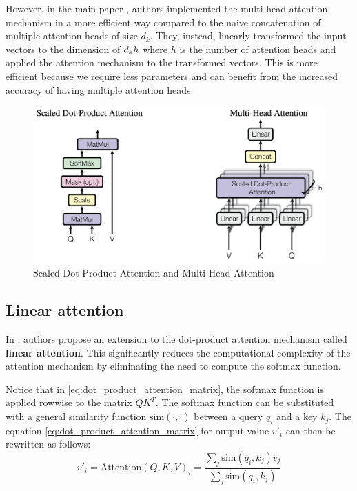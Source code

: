 \documentclass[a4paper, twoside]{report}
\theoremstyle{definition}
\numberwithin{equation}{section}
\begin{document}
However, in the main paper \cite{1706.03762}, authors implemented the multi-head attention mechanism
in a more efficient way compared to the naive concatenation of multiple attention heads
of size $d_k$. They, instead, linearly transformed the input vectors
to the dimension of $d_k\/h$ where $h$ is the number of attention heads and applied
the attention mechanism to the transformed vectors. This is more efficient because
we require less parameters and can benefit from the increased accuracy of having
multiple attention heads.


\begin{figure}[h!]
    \centering
    \includegraphics[scale=0.15]{scaled_dot_product_attention.png}
    \caption{Scaled Dot-Product Attention and Multi-Head Attention \cite{1706.03762}}
    \label{fig:scaled_dot_product_attention}
\end{figure}


\subsection{Linear attention} \label{sec:linear_attention}

In \cite{2006.16236}, authors propose an extension to the dot-product attention mechanism called \textbf{linear attention}.
This significantly reduces the computational complexity of the attention mechanism by eliminating the need to compute the softmax function.

Notice that in \ref{eq:dot_product_attention_matrix}, the softmax function is applied rowwise to the matrix $Q K^T$.
The softmax function can be substituted with a general similarity function $\text{sim}(\cdot, \cdot)$ between a query $q_i$ and a key $k_j$.
The equation \ref{eq:dot_product_attention_matrix} for output value $v'_i$ can then be rewritten as follows:
\begin{equation}
    v'_i=\text{Attention}(Q, K, V)_i=\frac{\sum_j \text{sim}(q_i, k_j) v_j}{\sum_j \text{sim}(q_i, k_j)}
\end{equation}
\end{document}
